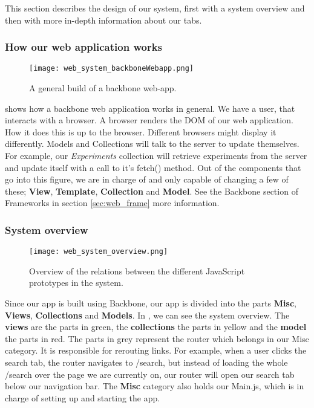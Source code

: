 This section describes the design of our system, first with a system overview
and then with more in-depth information about our tabs.
\subsubsection{How our web application works}
\begin{figure}[h]
\centering
\texttt{[image: web\_system\_backboneWebapp.png]}
\caption{\label{fig:web_system_backboneWebapp}A general build of a backbone web-app.}
\end{figure}

 shows how a backbone\cite{web_1} web application works in general. We have a user, that interacts with a browser. A browser renders the DOM of our web application. How it does this is up to the browser. Different browsers might display it differently. Models and Collections will talk to the server to update themselves. For example, our \textit{Experiments} collection will retrieve experiments from the server and update itself with a call to it’s fetch() method. Out of the components that go into this figure, we are in charge of and only capable of changing a few of these; \textbf{View}, \textbf{Template}, \textbf{Collection} and \textbf{Model}. See the Backbone section of Frameworks in section \ref{sec:web_frame} more information.

\subsubsection{System overview}
\begin{figure}[h]
\centering
\texttt{[image: web\_system\_overview.png]}
\caption{\label{fig:web_system_overview}Overview of the relations between the different JavaScript prototypes in the system.}
\end{figure}

Since our app is built using Backbone\cite{web_1}, our app is divided into the parts \textbf{Misc}, \textbf{Views}, \textbf{Collections} and \textbf{Models}. In , we can see the system overview. The \textbf{views} are the parts in green, the \textbf{collections} the parts in yellow and the \textbf{model} the parts in red. The parts in grey represent the router which belongs in our Misc category. It is responsible for rerouting links. For example, when a user clicks the search tab, the router navigates to /search, but instead of loading the whole /search over the page we are currently on, our router will open our search tab below our navigation bar. The \textbf{Misc} category also holds our Main.js, which is in charge of setting up and starting the app.


